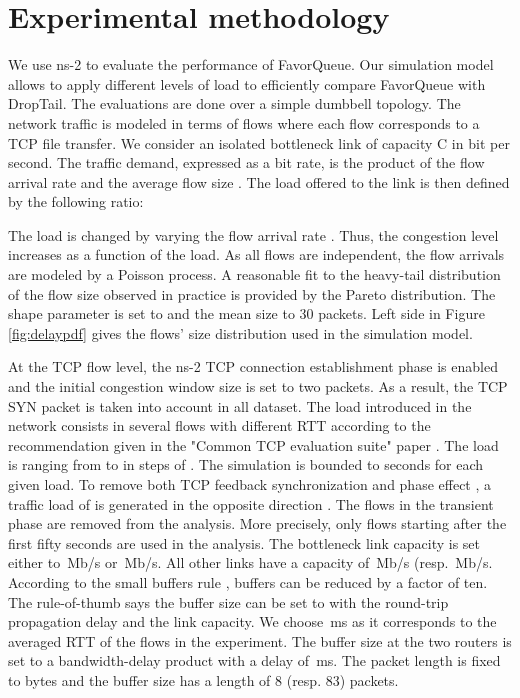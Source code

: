 \documentclass{elsart}
\begin{document}
\section{Experimental methodology}
\label{sec:exp}

We use ns-2 to evaluate the performance of FavorQueue. Our simulation model allows to apply different levels of load to efficiently compare FavorQueue with DropTail. The evaluations are done over a simple dumbbell topology. The network traffic is modeled in terms of flows where each flow corresponds to a TCP file transfer. We consider an isolated bottleneck link of capacity C in bit per second. The traffic demand, expressed as a bit rate, is the product of the flow arrival rate  and the average flow size . The load offered to the link is then defined by the following ratio:



The load is changed by varying the flow arrival rate \cite{Lachlan2008}. Thus, the congestion level increases as a function of the load. As all flows are independent, the flow arrivals are modeled by a Poisson process. 
A reasonable fit to the heavy-tail distribution of the flow size observed in practice is provided by the Pareto distribution. The shape parameter is set to  and the mean size to 30 packets. 
Left side in Figure \ref{fig:delaypdf} gives the flows' size distribution used in the simulation model.

At the TCP flow level, the ns-2 TCP connection establishment phase is enabled and the initial congestion window size is set to two packets. As a result, the TCP SYN packet is taken into account in all dataset.
The load introduced in the network consists in several flows with different RTT according to the recommendation given in the "Common TCP evaluation suite" paper \cite{Lachlan2008}. The load is ranging from  to  in steps of . The simulation is bounded to  seconds for each given load. To remove both TCP feedback synchronization and phase effect \cite{Lachlan2008}, a traffic load of  is generated in the opposite direction \cite{Lachlan2008}. The flows in the transient phase are removed from the analysis. More precisely, only flows starting after the first fifty seconds are used in the analysis. 
The bottleneck link capacity is set either to \,Mb/s or \,Mb/s. All other links have a capacity of \,Mb/s (resp. \,Mb/s. According to the small buffers rule \cite{Ganjali06}, buffers can be reduced by a factor of ten. The rule-of-thumb says the buffer size  can be set to  with  the round-trip propagation delay and  the link capacity. We choose \,ms as it corresponds to the averaged RTT of the flows in the experiment. The buffer size at the two routers is set to a bandwidth-delay product with a delay of \,ms. The packet length is fixed to  bytes and the buffer size has a length of 8 (resp. 83) packets. 
\end{document}
